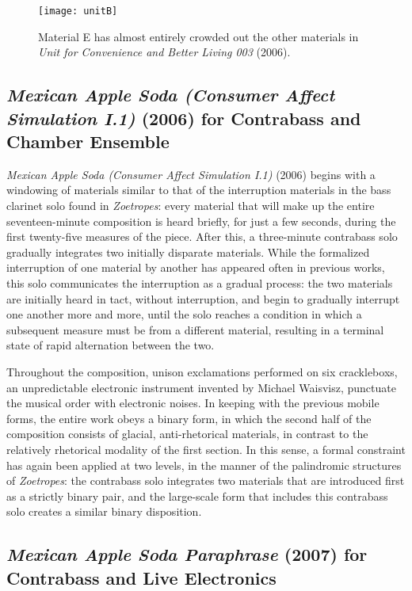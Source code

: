 \begin{figure}[H] 
\texttt{[image: unitB]}
\caption{Material E has almost entirely crowded out the other materials in \emph{Unit for Convenience and Better Living 003} (2006). } 
\end{figure}

\subsection{\emph{Mexican Apple Soda (Consumer Affect Simulation I.1)} (2006) for Contrabass and Chamber Ensemble}

\emph{Mexican Apple Soda (Consumer Affect Simulation I.1)} (2006) begins with a windowing of materials similar to that of the interruption materials in the bass clarinet solo found in \emph{Zoetropes}: every material that will make up the entire seventeen-minute composition is heard briefly, for just a few seconds, during the first twenty-five measures of the piece. After this, a three-minute contrabass solo gradually integrates two initially disparate materials. While the formalized interruption of one material by another has appeared often in previous works, this solo communicates the interruption as a gradual process: the two materials are initially heard in tact, without interruption, and begin to gradually interrupt one another more and more, until the solo reaches a condition in which a subsequent measure must be from a different material, resulting in a terminal state of rapid alternation between the two.

Throughout the composition, unison exclamations performed on six crackleboxs, an unpredictable electronic instrument invented by Michael Waisvisz, punctuate the musical order with electronic noises. In keeping with the previous mobile forms, the entire work obeys a binary form, in which the second half of the composition consists of glacial, anti-rhetorical materials, in contrast to the relatively rhetorical modality of the first section. In this sense, a formal constraint has again been applied at two levels, in the manner of the palindromic structures of \emph{Zoetropes}: the contrabass solo integrates two materials that are introduced first as a strictly binary pair, and the large-scale form that includes this contrabass solo creates a similar binary disposition.

\subsection{\emph{Mexican Apple Soda Paraphrase} (2007) for Contrabass and Live Electronics}

